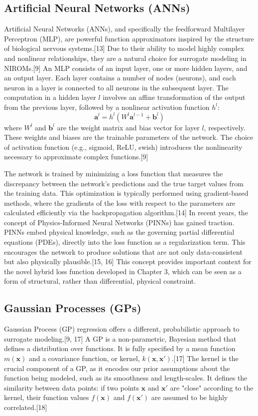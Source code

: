 \documentclass[12pt, a4paper]{report}
\begin{document}
\subsection{Artificial Neural Networks (ANNs)}
Artificial Neural Networks (ANNs), and specifically the feedforward Multilayer Perceptron (MLP), are powerful function approximators inspired by the structure of biological nervous systems.[13] Due to their ability to model highly complex and nonlinear relationships, they are a natural choice for surrogate modeling in NIROMs.[9] An MLP consists of an input layer, one or more hidden layers, and an output layer. Each layer contains a number of nodes (neurons), and each neuron in a layer is connected to all neurons in the subsequent layer. The computation in a hidden layer $l$ involves an affine transformation of the output from the previous layer, followed by a nonlinear activation function $h^l$:
$$\mathbf{a}^l = h^l(W^l \mathbf{a}^{l-1} + \mathbf{b}^l)$$
where $W^l$ and $\mathbf{b}^l$ are the weight matrix and bias vector for layer $l$, respectively. These weights and biases are the trainable parameters of the network. The choice of activation function (e.g., sigmoid, ReLU, swish) introduces the nonlinearity necessary to approximate complex functions.[9]

The network is trained by minimizing a loss function that measures the discrepancy between the network's predictions and the true target values from the training data. This optimization is typically performed using gradient-based methods, where the gradients of the loss with respect to the parameters are calculated efficiently via the backpropagation algorithm.[14] In recent years, the concept of Physics-Informed Neural Networks (PINNs) has gained traction. PINNs embed physical knowledge, such as the governing partial differential equations (PDEs), directly into the loss function as a regularization term. This encourages the network to produce solutions that are not only data-consistent but also physically plausible.[15, 16] This concept provides important context for the novel hybrid loss function developed in Chapter 3, which can be seen as a form of structural, rather than differential, physical constraint.

\subsection{Gaussian Processes (GPs)}
Gaussian Process (GP) regression offers a different, probabilistic approach to surrogate modeling.[9, 17] A GP is a non-parametric, Bayesian method that defines a distribution over functions. It is fully specified by a mean function $m(\mathbf{x})$ and a covariance function, or kernel, $k(\mathbf{x}, \mathbf{x}')$.[17] The kernel is the crucial component of a GP, as it encodes our prior assumptions about the function being modeled, such as its smoothness and length-scales. It defines the similarity between data points: if two points $\mathbf{x}$ and $\mathbf{x}'$ are "close" according to the kernel, their function values $f(\mathbf{x})$ and $f(\mathbf{x}')$ are assumed to be highly correlated.[18]
\end{document}
